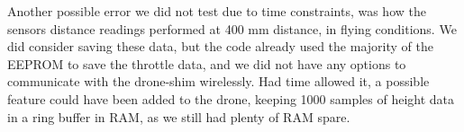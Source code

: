 Another possible error we did not test due to time constraints, was how the sensors distance readings performed at 400 mm distance, in flying conditions. We did consider saving these data, but the code already used the majority of the EEPROM to save the throttle data, and we did not have any options to communicate with the drone-shim wirelessly.
Had time allowed it, a possible feature could have been added to the drone, keeping 1000 samples of height data in a ring buffer in RAM, as we still had plenty of RAM spare. 
























